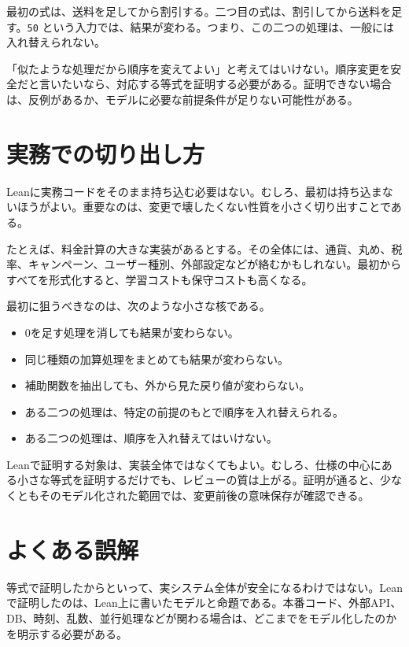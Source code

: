 最初の式は、送料を足してから割引する。二つ目の式は、割引してから送料を足す。\texttt{50} という入力では、結果が変わる。つまり、この二つの処理は、一般には入れ替えられない。

\begin{warningbox}
「似たような処理だから順序を変えてよい」と考えてはいけない。順序変更を安全だと言いたいなら、対応する等式を証明する必要がある。証明できない場合は、反例があるか、モデルに必要な前提条件が足りない可能性がある。
\end{warningbox}

\section{実務での切り出し方}

Leanに実務コードをそのまま持ち込む必要はない。むしろ、最初は持ち込まないほうがよい。重要なのは、変更で壊したくない性質を小さく切り出すことである。

たとえば、料金計算の大きな実装があるとする。その全体には、通貨、丸め、税率、キャンペーン、ユーザー種別、外部設定などが絡むかもしれない。最初からすべてを形式化すると、学習コストも保守コストも高くなる。

最初に狙うべきなのは、次のような小さな核である。

\begin{itemize}
\item 0を足す処理を消しても結果が変わらない。
\item 同じ種類の加算処理をまとめても結果が変わらない。
\item 補助関数を抽出しても、外から見た戻り値が変わらない。
\item ある二つの処理は、特定の前提のもとで順序を入れ替えられる。
\item ある二つの処理は、順序を入れ替えてはいけない。
\end{itemize}

\begin{leanbox}
Leanで証明する対象は、実装全体ではなくてもよい。むしろ、仕様の中心にある小さな等式を証明するだけでも、レビューの質は上がる。証明が通ると、少なくともそのモデル化された範囲では、変更前後の意味保存が確認できる。
\end{leanbox}

\section{よくある誤解}

\begin{warningbox}
等式で証明したからといって、実システム全体が安全になるわけではない。Leanで証明したのは、Lean上に書いたモデルと命題である。本番コード、外部API、DB、時刻、乱数、並行処理などが関わる場合は、どこまでをモデル化したのかを明示する必要がある。
\end{warningbox}

